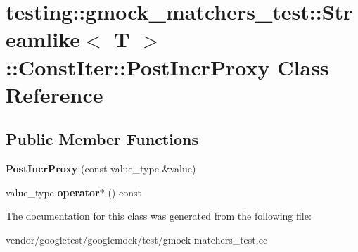 \hypertarget{classtesting_1_1gmock__matchers__test_1_1_streamlike_1_1_const_iter_1_1_post_incr_proxy}{}\section{testing\+:\+:gmock\+\_\+matchers\+\_\+test\+:\+:Streamlike$<$ T $>$\+:\+:Const\+Iter\+:\+:Post\+Incr\+Proxy Class Reference}
\label{classtesting_1_1gmock__matchers__test_1_1_streamlike_1_1_const_iter_1_1_post_incr_proxy}
\subsection*{Public Member Functions}
\begin{DoxyCompactItemize}
\item 
\mbox{\label{classtesting_1_1gmock__matchers__test_1_1_streamlike_1_1_const_iter_1_1_post_incr_proxy_a1915f8db9943b0a995c4e01d6120fc80}} 
{\bfseries Post\+Incr\+Proxy} (const value\+\_\+type \&value)
\item 
\mbox{\label{classtesting_1_1gmock__matchers__test_1_1_streamlike_1_1_const_iter_1_1_post_incr_proxy_a7d5416380b6b6cec0d0ed5b5c9be17b3}} 
value\+\_\+type {\bfseries operator$\ast$} () const
\end{DoxyCompactItemize}


The documentation for this class was generated from the following file\+:\begin{DoxyCompactItemize}
\item 
vendor/googletest/googlemock/test/gmock-\/matchers\+\_\+test.\+cc\end{DoxyCompactItemize}
